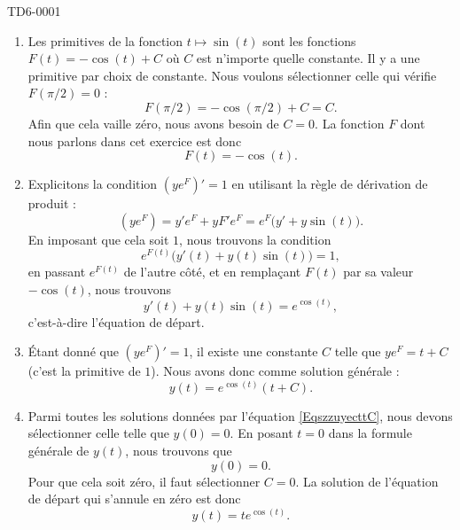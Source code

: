 
\begin{corrige}{TD6-0001}

	\begin{enumerate}
		\item
			Les primitives de la fonction $t\mapsto\sin(t)$ sont les fonctions $F(t)=-\cos(t)+C$ où $C$ est n'importe quelle constante. Il y a une primitive par choix de constante. Nous voulons sélectionner celle qui vérifie $F(\pi/2)=0$ :
			\begin{equation}
				F(\pi/2)=-\cos(\pi/2)+C=C.
			\end{equation}
			Afin que cela vaille zéro, nous avons besoin de $C=0$. La fonction $F$ dont nous parlons dans cet exercice est donc
			\begin{equation}
				F(t)=-\cos(t).
			\end{equation}
		\item
			Explicitons la condition $(y e^{F})'=1$ en utilisant la règle de dérivation de produit :
			\begin{equation}
				(y e^{F})=y' e^{F}+yF'e^F=e^F\big( y'+y\sin(t)\big).
			\end{equation}
			En imposant que cela soit $1$, nous trouvons la condition
			\begin{equation}
				e^{F(t)}\big( y'(t)+y(t)\sin(t) \big)=1,
			\end{equation}
			en passant $ e^{F(t)}$ de l'autre côté, et en remplaçant $F(t)$ par sa valeur $-\cos(t)$, nous trouvons
			\begin{equation}
				y'(t)+y(t)\sin(t)= e^{\cos(t)},
			\end{equation}
			c'est-à-dire l'équation de départ.
		\item
			Étant donné que $(y e^{F})'=1$, il existe une constante $C$ telle que $ye^F=t+C$ (c'est la primitive de $1$). Nous avons donc comme solution générale :
			\begin{equation}		\label{EqszzuyecttC}
				y(t)= e^{\cos(t)}(t+C).
			\end{equation}
		\item
			Parmi toutes les solutions données par l'équation \eqref{EqszzuyecttC}, nous devons sélectionner celle telle que $y(0)=0$. En posant $t=0$ dans la formule générale de $y(t)$, nous trouvons que
			\begin{equation}
				y(0)=0.
			\end{equation}
			Pour que cela soit zéro, il faut sélectionner $C=0$. La solution de l'équation de départ qui s'annule en zéro est donc
			\begin{equation}
				y(t)=t e^{\cos(t)}.
			\end{equation}
	\end{enumerate}

\end{corrige}
